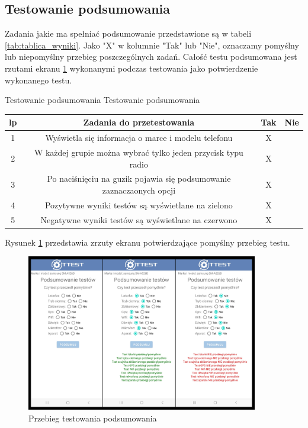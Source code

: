 \newpage


\subsection{Testowanie podsumowania}

\hspace{0.60cm}Zadania jakie ma spełniać podsumowanie przedstawione są w tabeli \ref{tab:tablica_wyniki}. Jako "X" w kolumnie "Tak" lub "Nie", oznaczamy pomyślny lub niepomyślny przebieg poszczególnych zadań. Całość testu podsumowana jest rzutami ekranu \ref{rys:wyniki_5} wykonanymi podczas testowania jako potwierdzenie wykonanego testu.

\begin{tabela}
	{Testowanie podsumowania}	%
	{Testowanie podsumowania}	%
	{
		\begin{tabular}{|c|c|c|c|} \hline
			\textbf{lp} & \textbf{Zadania do przetestowania} & \textbf{Tak} & \textbf{Nie} \\ \hline
			1 & Wyświetla się informacja o marce i modelu telefonu & X & ~ \\ \hline
			2 & W każdej grupie można wybrać tylko jeden przycisk typu radio & X & ~ \\ \hline
			3 & Po naciśnięciu na guzik pojawia się podsumowanie zaznaczaonych opcji & X & ~ \\ \hline
			4 & Pozytywne wyniki testów są wyświetlane na zielono & X & ~ \\ \hline
			5 & Negatywne wyniki testów są wyświetlane na czerwono & X & ~ \\ \hline
	\end{tabular}	}
	\label{tab:tablica_wyniki}
\end{tabela}

Rysunek \ref{rys:wyniki_5} przedstawia zrzuty ekranu potwierdzające pomyślny przebieg testu.

\begin{figure}[!hbt]
	\begin{center}
		\includegraphics[angle=360, width=0.90\textwidth]{rys/punkt5/wyniki.png}
		\caption{Przebieg testowania podsumowania}
		\label{rys:wyniki_5}
	\end{center}
\end{figure}   

\newpage

